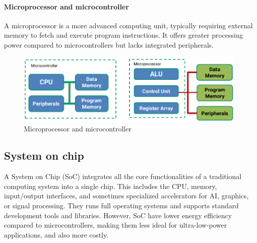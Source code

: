 \paragraph*{Microprocessor and microcontroller} 
A microprocessor is a more advanced computing unit, typically requiring external memory to fetch and execute program instructions. 
It offers greater processing power compared to microcontrollers but lacks integrated peripherals.
\begin{figure}[H]
    \centering
    \includegraphics[width=0.5\linewidth]{images/eeai5.png}
    \caption{Microprocessor and microcontroller}
\end{figure}

\subsection{System on chip}
A System on Chip (SoC) integrates all the core functionalities of a traditional computing system into a single chip.
This includes the CPU, memory, input/output interfaces, and sometimes specialized accelerators for AI, graphics, or signal processing.
They runs full operating systems and supports standard development tools and libraries. 
However, SoC have lower energy efficiency compared to microcontrollers, making them less ideal for ultra-low-power applications, and also more costly.

